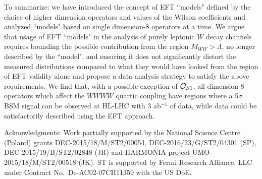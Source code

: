 \documentclass[../report.tex]{subfiles}
\begin{document}
To summarize:  we  have introduced the concept of EFT ``models" defined by the choice of higher dimension operators and values of the Wilson coefficients and analyzed ``models" based on single dimension-8 operators at a time.  
We argue that usage of EFT ``models" in the analysis of purely
leptonic $W$ decay channels requires bounding the possible contribution from
the region $M_{WW} > \Lambda$, no longer described by the ``model",
and ensuring it does not significantly distort the measured distributions 
compared to what they would have looked from the region of EFT validity alone and 
propose a data analysis strategy to satisfy the above requirements.  We find that, with a possible exception of ${\cal O}_{S1}$, all dimension-8 operators which affect the
$WWWW$ quartic coupling have regions where
a 5$\sigma$ BSM signal can be observed at HL-LHC with 3 ab$^{-1}$ of data, while data
could be satisfactorily described using the EFT approach. 

%
Acknowledgments: 
Work partially supported by the National Science Centre (Poland) grants
DEC-2015/18/M/ST2/00054,  DEC-2016/23/G/ST2/04301 (SP), DEC-2015/19/B/ST2/02848 (JR) and 
HARMONIA project 
UMO-2015/18/M/ST2/00518  (JK). 
ST is supported by Fermi Research Alliance, LLC under Contract No.~De-AC02-07CH11359 with the US DoE.
\end{document}

